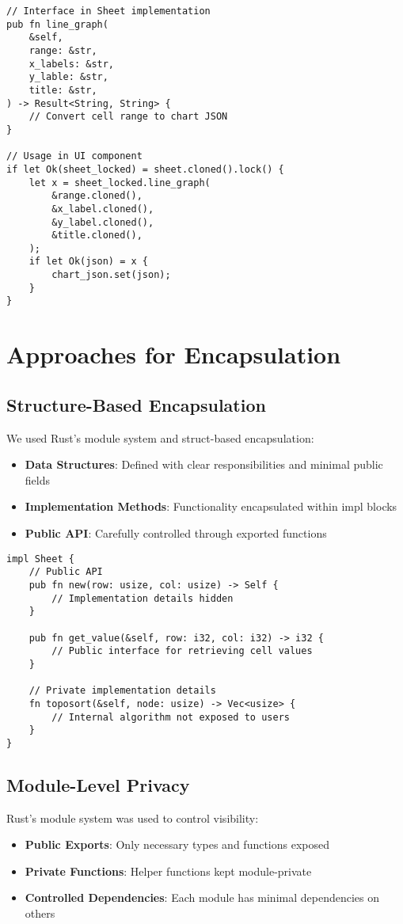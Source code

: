 \documentclass[12pt]{article}
\begin{document}
\begin{lstlisting}[caption={Graph interface example}]
// Interface in Sheet implementation
pub fn line_graph(
    &self,
    range: &str,
    x_labels: &str,
    y_lable: &str,
    title: &str,
) -> Result<String, String> {
    // Convert cell range to chart JSON
}

// Usage in UI component
if let Ok(sheet_locked) = sheet.cloned().lock() {
    let x = sheet_locked.line_graph(
        &range.cloned(),
        &x_label.cloned(),
        &y_label.cloned(),
        &title.cloned(),
    );
    if let Ok(json) = x {
        chart_json.set(json);
    }
}
\end{lstlisting}

\section{Approaches for Encapsulation}

\subsection{Structure-Based Encapsulation}
We used Rust's module system and struct-based encapsulation:
\begin{itemize}
    \item \textbf{Data Structures}: Defined with clear responsibilities and minimal public fields
    \item \textbf{Implementation Methods}: Functionality encapsulated within impl blocks
    \item \textbf{Public API}: Carefully controlled through exported functions
\end{itemize}

\begin{lstlisting}[caption={Encapsulation through method implementation}]
impl Sheet {
    // Public API
    pub fn new(row: usize, col: usize) -> Self {
        // Implementation details hidden
    }
    
    pub fn get_value(&self, row: i32, col: i32) -> i32 {
        // Public interface for retrieving cell values
    }
    
    // Private implementation details
    fn toposort(&self, node: usize) -> Vec<usize> {
        // Internal algorithm not exposed to users
    }
}
\end{lstlisting}

\subsection{Module-Level Privacy}
Rust's module system was used to control visibility:
\begin{itemize}
    \item \textbf{Public Exports}: Only necessary types and functions exposed
    \item \textbf{Private Functions}: Helper functions kept module-private
    \item \textbf{Controlled Dependencies}: Each module has minimal dependencies on others
\end{itemize}
\end{document}
